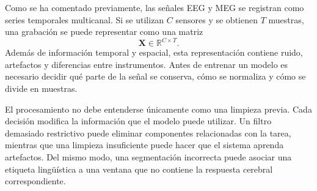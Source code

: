 Como se ha comentado previamente, las señales EEG y MEG se registran como series temporales multicanal. Si se utilizan \(C\) sensores y se obtienen \(T\) muestras, una grabación se puede representar como una matriz
\[
    \mathbf{X} \in \mathbb{R}^{C \times T}.
\]
Además de información temporal y espacial, esta representación contiene ruido, artefactos y diferencias entre instrumentos. Antes de entrenar un modelo es necesario decidir qué parte de la señal se conserva, cómo se normaliza y cómo se divide en muestras.

El procesamiento no debe entenderse únicamente como una limpieza previa. Cada decisión modifica la información que el modelo puede utilizar. Un filtro demasiado restrictivo puede eliminar componentes relacionadas con la tarea, mientras que una limpieza insuficiente puede hacer que el sistema aprenda artefactos. Del mismo modo, una segmentación incorrecta puede asociar una etiqueta lingüística a una ventana que no contiene la respuesta cerebral correspondiente.

